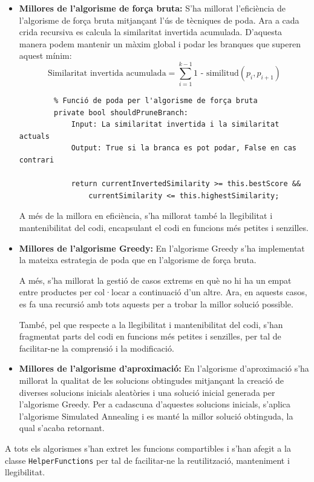 \documentclass[a4paper,12pt]{report}
\begin{document}
\begin{itemize}
	\item \textbf{Millores de l'algorisme de força bruta:} 
		S'ha millorat l'eficiència de l'algorisme de força bruta mitjançant l'ús de tècniques de poda. Ara a cada crida recursiva es calcula la similaritat invertida acumulada. D'aquesta manera podem mantenir un màxim global i podar les branques que superen aquest mínim:
		\[
			\text{Similaritat invertida acumulada} = \sum_{i=1}^{k-1} \text{1 - similitud}(p_i, p_{i+1})
		\]
		
		\begin{verbatim}
		% Funció de poda per l'algorisme de força bruta
		private bool shouldPruneBranch:
			Input: La similaritat invertida i la similaritat actuals
			Output: True si la branca es pot podar, False en cas contrari

			return currentInvertedSimilarity >= this.bestScore && 
				currentSimilarity <= this.highestSimilarity;
		\end{verbatim}

		A més de la millora en eficiència, s'ha millorat també la llegibilitat i mantenibilitat del codi, encapsulant el codi en funcions més petites i senzilles.
	
	\item \textbf{Millores de l'algorisme Greedy:}
		En l'algorisme Greedy s'ha implementat la mateixa estrategia de poda que en l'algorisme de força bruta. 

		A més, s'ha millorat la gestió de casos extrems en què no hi ha un empat entre productes per col·locar a continuació d'un altre. Ara, en aquests casos, es fa una recursió amb tots aquests per a trobar la millor solució possible. 

		També, pel que respecte a la llegibilitat i mantenibilitat del codi, s'han fragmentat parts del codi en funcions més petites i senzilles, per tal de facilitar-ne la comprensió i la modificació.
		
	\item \textbf{Millores de l'algorisme d'aproximació:}
		En l'algorisme d'aproximació s'ha millorat la qualitat de les solucions obtingudes mitjançant la creació de diverses solucions inicials aleatòries i una solució inicial generada per l'algorisme Greedy. 
		Per a cadascuna d'aquestes solucions inicials, s'aplica l'algorisme Simulated Annealing i es manté la millor solució obtinguda, la qual s'acaba retornant.
\end{itemize}

A tots els algorismes s'han extret les funcions compartibles i s'han afegit a la classe \texttt{HelperFunctions} per tal de facilitar-ne la reutilització, manteniment i llegibilitat.
\end{document}
